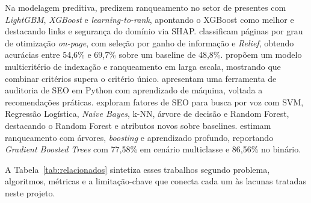 \documentclass[12pt]{article}
\begin{document}
Na modelagem preditiva, \cite{salminen2019} predizem ranqueamento no setor de presentes com
\textit{LightGBM}, \textit{XGBoost} e \textit{learning-to-rank}, apontando o XGBoost como melhor e
destacando links e segurança do domínio via SHAP. \cite{matosevic2021} classificam páginas por
grau de otimização \textit{on-page}, com seleção por ganho de informação e \textit{Relief},
obtendo acurácias entre 54,6\% e 69,7\% sobre um baseline de 48,8\%. \cite{attia2022} propõem um
modelo multicritério de indexação e ranqueamento em larga escala, mostrando que combinar critérios
supera o critério único. \cite{roumeliotis2023} apresentam uma ferramenta de auditoria de SEO em
Python com aprendizado de máquina, voltada a recomendações práticas. \cite{saeed2024} exploram
fatores de SEO para busca por voz com SVM, Regressão Logística, \textit{Naive Bayes}, k-NN, árvore
de decisão e Random Forest, destacando o Random Forest e atributos novos sobre baselines.
\cite{almadhoun2025} estimam ranqueamento com árvores, \textit{boosting} e aprendizado profundo,
reportando \textit{Gradient Boosted Trees} com 77,58\% em cenário multiclasse e 86,56\% no binário.

A Tabela~\ref{tab:relacionados} sintetiza esses trabalhos segundo problema, algoritmos, métricas
e a limitação-chave que conecta cada um às lacunas tratadas neste projeto.
\end{document}
